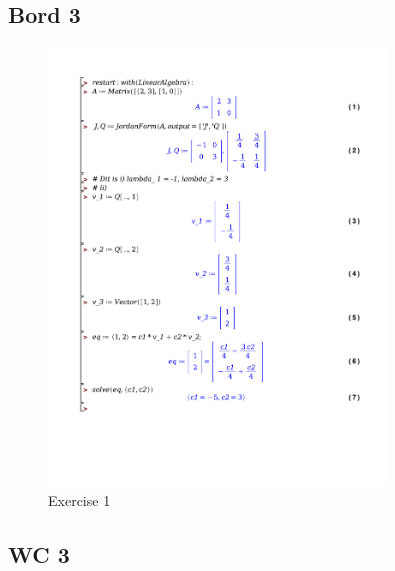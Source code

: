 \documentclass[a4paper]{report}
\begin{document}



\subsection{Bord 3}

\begin{figure}[H]
	\centering
	\includegraphics[width=0.8\textwidth]{exercises/bord_3_ex_1.pdf}
	\caption{Exercise 1}
	\label{fig:bord_3_ex_1}
\end{figure}



\subsection{WC 3}
\end{document}
